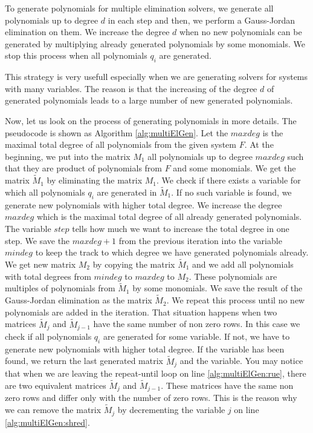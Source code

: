 To generate polynomials for multiple elimination solvers, we generate all polynomials up to degree $d$ in each step and then, we perform a Gauss-Jordan elimination on them. We increase the degree $d$ when no new polynomials can be generated by multiplying already generated polynomials by some monomials. We stop this process when all polynomials $q_i$ are generated. 

This strategy is very usefull especially when we are generating solvers for systems with many variables. The reason is that the increasing of the degree $d$ of generated polynomials leads to a large number of new generated polynomials.

Now, let us look on the process of generating polynomials in more details. The pseudocode is shown as Algorithm \ref{alg:multiElGen}. Let the $maxdeg$ is the maximal total degree of all polynomials from the given system $F$. At the beginning, we put into the matrix $M_1$ all polynomials up to degree $maxdeg$ such that they are product of polynomials from $F$ and some monomials. We get the matrix $\tilde{M}_1$ by eliminating the matrix $M_1$. We check if there exists a variable for which all polynomials $q_i$ are generated in $\tilde{M}_1$. If no such variable is found, we generate new polynomials with higher total degree. We increase the degree $maxdeg$ which is the maximal total degree of all already generated polynomials. The variable $step$ tells how much we want to increase the total degree in one step. We save the $maxdeg + 1$ from the previous iteration into the variable $mindeg$ to keep the track to which degree we have generated polynomials already. We get new matrix $M_2$ by copying the matrix $\tilde{M}_1$ and we add all polynomials with total degrees from $mindeg$ to $maxdeg$ to $M_2$. These polynomials are multiples of polynomials from $\tilde{M}_1$ by some monomials. We save the result of the Gauss-Jordan elimination as the matrix $\tilde{M}_2$. We repeat this process until no new polynomials are added in the iteration. That situation happens when two matrices $\tilde{M}_j$ and $\tilde{M}_{j-1}$ have the same number of non zero rows. In this case we check if all polynomials $q_i$ are generated for some variable. If not, we have to generate new polynomials with higher total degree. If the variable has been found, we return the last generated matrix $\tilde{M}_j$ and the variable. You may notice that when we are leaving the repeat-until loop on line \ref{alg:multiElGen:rue}, there are two equivalent matrices $\tilde{M}_j$ and $\tilde{M}_{j-1}$. These matrices have the same non zero rows and differ only with the number of zero rows. This is the reason why we can remove the matrix $\tilde{M}_j$ by decrementing the variable $j$ on line \ref{alg:multiElGen:shred}.

